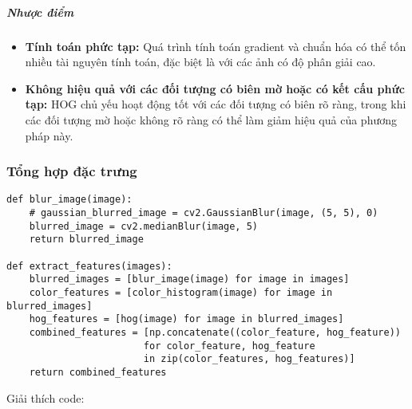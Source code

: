 \documentclass[a4paper,12pt]{article}
\begin{document}
\subparagraph{Nhược điểm}
\begin{itemize}
    \item \textbf{Tính toán phức tạp:} Quá trình tính toán gradient và chuẩn hóa có thể tốn nhiều tài nguyên tính toán, đặc biệt là với các ảnh có độ phân giải cao.
    \item \textbf{Không hiệu quả với các đối tượng có biên mờ hoặc có kết cấu phức tạp:} HOG chủ yếu hoạt động tốt với các đối tượng có biên rõ ràng, trong khi các đối tượng mờ hoặc không rõ ràng có thể làm giảm hiệu quả của phương pháp này.
\end{itemize}
\vspace{5mm}


\subsubsection{Tổng hợp đặc trưng}
\label{subsubsec:tong-hop-dac-trung}

\begin{verbatim}
def blur_image(image):
    # gaussian_blurred_image = cv2.GaussianBlur(image, (5, 5), 0)
    blurred_image = cv2.medianBlur(image, 5)
    return blurred_image

def extract_features(images):
    blurred_images = [blur_image(image) for image in images]
    color_features = [color_histogram(image) for image in blurred_images]
    hog_features = [hog(image) for image in blurred_images]
    combined_features = [np.concatenate((color_feature, hog_feature)) 
                        for color_feature, hog_feature 
                        in zip(color_features, hog_features)]
    return combined_features
\end{verbatim}

\noindent Giải thích code:
\end{document}
